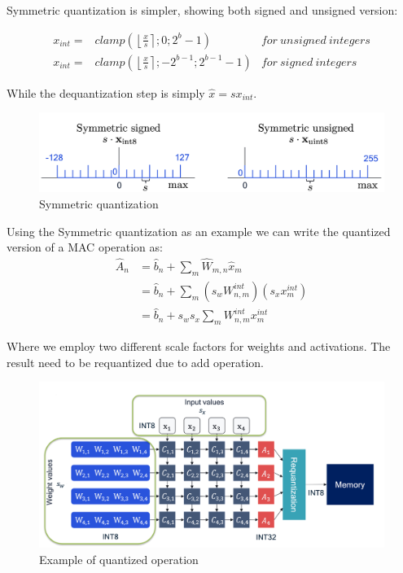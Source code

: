 \documentclass{article}
\begin{document}
        Symmetric quantization is simpler, showing both signed and unsigned version:
        
        \begin{equation}
          \begin{array}{cll}
            x_{int} = &clamp(\left\lfloor \frac{x}{s}  \right\rceil; 0 ; 2^b-1) &for\ unsigned\ integers \\
            x_{int} = &clamp(\left\lfloor \frac{x}{s}  \right\rceil; -2^{b-1} ; 2^{b-1}-1) &for\ signed\ integers
          \end{array}
        \end{equation}

        While the dequantization step is simply $\hat{x}=sx_{int}$.

        \begin{figure}[H]
          \includegraphics[scale=0.3]{../Images/SimmQuant.png}
          \centering
          \caption{Symmetric quantization}
        \end{figure}

        Using the Symmetric quantization as an example we can write the quantized version of a MAC operation as:
        \begin{equation}
          \begin{array}{cl}
            \hat{A}_n & = \hat{b}_n + \sum_{m}^{} \hat{W}_{m,n} \hat{x}_m \\
                      & = \hat{b}_n + \sum_{m}^{} (s_w W_{n,m}^{int})(s_x x_{m}^{int}) \\
                      & = \hat{b}_n + s_w s_x \sum_{m}^{} W_{n,m}^{int}x_{m}^{int}
          \end{array}
        \end{equation}

        Where we employ two different scale factors for weights and activations. The result need to be requantized due to add operation.

        \begin{figure}[H]
          \includegraphics[scale=0.3]{../Images/MatrixQuant.png}
          \centering
          \caption{Example of quantized operation}
        \end{figure}
\end{document}
